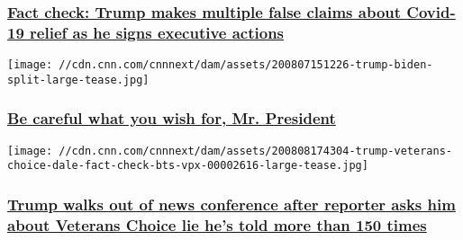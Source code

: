 \hypertarget{fact-check-trump-makes-multiple-false-claims-about-covid-19-relief-as-he-signs-executive-actions}{%
\subsubsection{\texorpdfstring{\href{/2020/08/08/politics/fact-check-trump-covid-executive-actions-bedminster/index.html}{Fact
check: Trump makes multiple false claims about Covid-19 relief as he
signs executive
actions}}{Fact check: Trump makes multiple false claims about Covid-19 relief as he signs executive actions}}\label{fact-check-trump-makes-multiple-false-claims-about-covid-19-relief-as-he-signs-executive-actions}}

\href{/2020/08/08/opinions/trump-fourth-debate-request-zelizer/index.html}{}

\texttt{[image: //cdn.cnn.com/cnnnext/dam/assets/200807151226-trump-biden-split-large-tease.jpg]}

\hypertarget{be-careful-what-you-wish-for-mr-president}{%
\subsubsection{\texorpdfstring{\href{/2020/08/08/opinions/trump-fourth-debate-request-zelizer/index.html}{Be
careful what you wish for, Mr.
President}}{Be careful what you wish for, Mr. President}}\label{be-careful-what-you-wish-for-mr-president}}

\href{/2020/08/08/politics/trump-veterans-choice-paula-reid/index.html}{}

\texttt{[image: //cdn.cnn.com/cnnnext/dam/assets/200808174304-trump-veterans-choice-dale-fact-check-bts-vpx-00002616-large-tease.jpg]}

\hypertarget{trump-walks-out-of-news-conference-after-reporter-asks-him-about-veterans-choice-lie-hes-told-more-than-150-times-}{%
\subsubsection{\texorpdfstring{\href{/2020/08/08/politics/trump-veterans-choice-paula-reid/index.html}{Trump
walks out of news conference after reporter asks him about Veterans
Choice lie he's told more than 150 times
}}{Trump walks out of news conference after reporter asks him about Veterans Choice lie he's told more than 150 times }}\label{trump-walks-out-of-news-conference-after-reporter-asks-him-about-veterans-choice-lie-hes-told-more-than-150-times-}}

\href{/2020/08/08/politics/trump-executive-order-stimulus/index.html}{}

